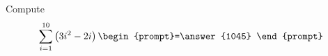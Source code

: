 \documentclass{ximera}
\author{Gregory Hartman \and Matthew Carr}
\begin{document}
\begin{exercise}

Compute
\[
\sum_{i=1}^{10}\left(3i^2-2i\right)\begin{prompt}=\answer{1045}
\end{prompt}
\]

\end{exercise}
\end{document}
